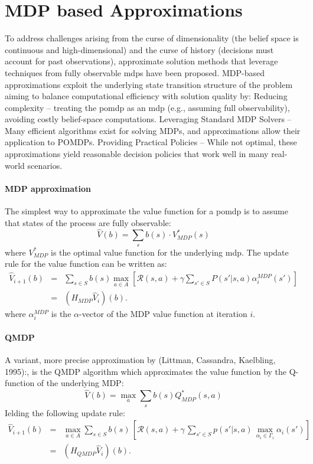 \section{MDP based Approximations}

To address challenges arising from the curse of dimensionality (the belief space is continuous and high-dimensional) 
and the curse of history (decisions must account for past observations), approximate solution methods that  
leverage techniques from fully observable \glspl{mdp} have been proposed. 
MDP-based approximations exploit the underlying state transition structure of the problem aiming 
to balance computational efficiency with solution quality by:
Reducing complexity – treating the \gls{pomdp} as an \gls{mdp} (e.g., assuming full observability), avoiding costly belief-space computations.
Leveraging Standard MDP Solvers – Many efficient algorithms exist for solving MDPs, and approximations allow their application to POMDPs.
Providing Practical Policies – While not optimal, these approximations yield reasonable decision policies that work well in many real-world scenarios.

\paragraph{MDP approximation}
The simplest way to approximate the value function for a \gls{pomdp} is to assume that states of 
the process are fully observable: $$\hat{V}(b) = \sum_s b(s)\cdot V_{MDP}^*(s)$$
where $V_{MDP}^*$ is the optimal value function for the underlying \gls{mdp}.
The update rule for the value function can be written as:
\[
\begin{array}{lll}
\widehat{V}_{i+1}(b) & = & \displaystyle\sum_{s\in S}b(s)\max\limits_{a\in A}\left[\mathcal{R}(s,a)+\gamma\sum_{s'\in S}P(s'|s,a)\alpha_{i}^{MDP}(s')\right]\\
 & = & \displaystyle(H_{MDP}\widehat{V}_{i})(b).
\end{array}
\]
where $\alpha_{i}^{MDP}$ is the $\alpha$-vector of the MDP value function at iteration $i$.
\paragraph{QMDP} A variant, more precise approximation by (Littman,
Cassandra, Kaelbling, 1995):, is the QMDP algorithm  
which approximates the value function by the Q-function of the underlying MDP:
$$\hat{V}(b) = \max_a \sum_s b(s) Q_{MDP}^*(s,a)$$
Ielding the following update rule:
\[
\begin{array}{rcl}
\widehat{V}_{i+1}(b) & = & \max\limits_{a\in A}\sum\limits_{s\in S}b(s)\,\left[\mathcal{R}(s,a)+\gamma\,\sum\limits_{s'\in S}p(s'|s,a)\,\max\limits_{\alpha_{i}\in\Gamma_{i}}\alpha_{i}(s')\right]\\
 & = & (H_{QMDP}\widehat{V}_{i})(b).
\end{array}
\]

